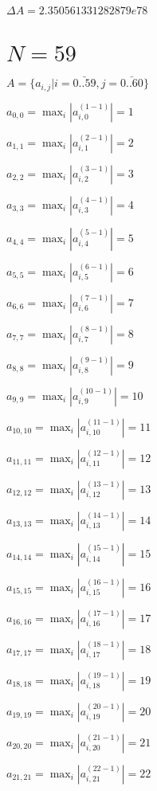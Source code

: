 \documentclass[a4paper,12pt]{article}
\begin{document}
$\Delta A = 2.350561331282879e78$



\section{ $N = 59$ }
$A = \{ a _{ i, j } | i = \bar { 0..59 }, j = \bar { 0..60 } \}$

$a _{ 0, 0 } =  \max _i |a _{ i, 0 } ^{ (1 - 1) } | = 1$

$a _{ 1, 1 } =  \max _i |a _{ i, 1 } ^{ (2 - 1) } | = 2$

$a _{ 2, 2 } =  \max _i |a _{ i, 2 } ^{ (3 - 1) } | = 3$

$a _{ 3, 3 } =  \max _i |a _{ i, 3 } ^{ (4 - 1) } | = 4$

$a _{ 4, 4 } =  \max _i |a _{ i, 4 } ^{ (5 - 1) } | = 5$

$a _{ 5, 5 } =  \max _i |a _{ i, 5 } ^{ (6 - 1) } | = 6$

$a _{ 6, 6 } =  \max _i |a _{ i, 6 } ^{ (7 - 1) } | = 7$

$a _{ 7, 7 } =  \max _i |a _{ i, 7 } ^{ (8 - 1) } | = 8$

$a _{ 8, 8 } =  \max _i |a _{ i, 8 } ^{ (9 - 1) } | = 9$

$a _{ 9, 9 } =  \max _i |a _{ i, 9 } ^{ (10 - 1) } | = 10$

$a _{ 10, 10 } =  \max _i |a _{ i, 10 } ^{ (11 - 1) } | = 11$

$a _{ 11, 11 } =  \max _i |a _{ i, 11 } ^{ (12 - 1) } | = 12$

$a _{ 12, 12 } =  \max _i |a _{ i, 12 } ^{ (13 - 1) } | = 13$

$a _{ 13, 13 } =  \max _i |a _{ i, 13 } ^{ (14 - 1) } | = 14$

$a _{ 14, 14 } =  \max _i |a _{ i, 14 } ^{ (15 - 1) } | = 15$

$a _{ 15, 15 } =  \max _i |a _{ i, 15 } ^{ (16 - 1) } | = 16$

$a _{ 16, 16 } =  \max _i |a _{ i, 16 } ^{ (17 - 1) } | = 17$

$a _{ 17, 17 } =  \max _i |a _{ i, 17 } ^{ (18 - 1) } | = 18$

$a _{ 18, 18 } =  \max _i |a _{ i, 18 } ^{ (19 - 1) } | = 19$

$a _{ 19, 19 } =  \max _i |a _{ i, 19 } ^{ (20 - 1) } | = 20$

$a _{ 20, 20 } =  \max _i |a _{ i, 20 } ^{ (21 - 1) } | = 21$

$a _{ 21, 21 } =  \max _i |a _{ i, 21 } ^{ (22 - 1) } | = 22$
\end{document}
